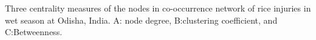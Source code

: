 Three centrality measures of the nodes in co-occurrence network of rice injuries in wet season at Odisha, India. A: node degree, B:clustering coefficient, and C:Betweenness.
        \label{fig:nodepropOR_ws}